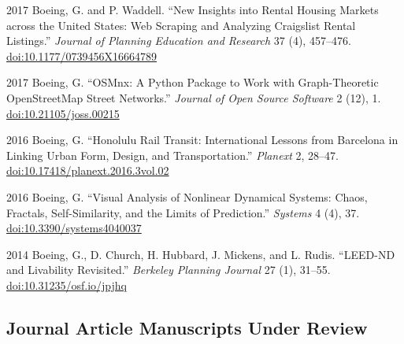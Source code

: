 \documentclass[12pt,letterpaper]{report}
\begin{document}
\begin{tablist}
		\item[2017] \tab Boeing, G. and P. Waddell. \enquote{New Insights into Rental Housing Markets across the United States: Web Scraping and Analyzing Craigslist Rental Listings.} \textit{Journal of Planning Education and Research} 37 (4), 457--476. \href{https://doi.org/10.1177/0739456X16664789}{doi:10.1177/0739456X16664789}
		
		\item[2017] \tab Boeing, G. \enquote{OSMnx: A Python Package to Work with Graph-Theoretic OpenStreetMap Street Networks.} \textit{Journal of Open Source Software} 2 (12), 1. \href{https://doi.org/10.21105/joss.00215}{doi:10.21105/joss.00215}
		
		\item[2016] \tab Boeing, G. \enquote{Honolulu Rail Transit: International Lessons from Barcelona in Linking Urban Form, Design, and Transportation.} \textit{Planext} 2, 28--47. \href{https://doi.org/10.17418/planext.2016.3vol.02}{doi:10.17418/planext.2016.3vol.02}
		
		\item[2016] \tab Boeing, G. \enquote{Visual Analysis of Nonlinear Dynamical Systems: Chaos, Fractals, Self-Similarity, and the Limits of Prediction.} \textit{Systems} 4 (4), 37. \href{https://doi.org/10.3390/systems4040037}{doi:10.3390/systems4040037}
		
		\item[2014] \tab Boeing, G., D. Church, H. Hubbard, J. Mickens, and L. Rudis. \enquote{LEED-ND and Livability Revisited.} \textit{Berkeley Planning Journal} 27 (1), 31--55. \href{https://doi.org/10.31235/osf.io/jpjhq}{doi:10.31235/osf.io/jpjhq}
		
	\end{tablist}
	
	
	
	\subsection*{Journal Article Manuscripts Under Review}
	
\end{document}
